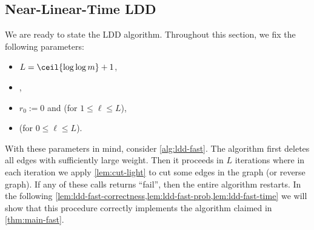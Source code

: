 \subsection{Near-Linear-Time LDD} \label{sec:ldd-fast:sec:algo}
We are ready to state the LDD algorithm. Throughout this section, we fix the following parameters:
\begin{itemize}
    \item $L = \ceil{\log\log m} + 1$,
    \item {},
    \item $r_0 := 0$ and  (for $1 \leq \ell \leq L$),
    \item {} (for $0 \leq \ell \leq L$).
\end{itemize}
With these parameters in mind, consider \cref{alg:ldd-fast}. The algorithm first deletes all edges with sufficiently large weight. Then it proceeds in $L$ iterations where in each iteration we apply \cref{lem:cut-light} to cut some edges in the graph (or reverse graph). If any of these calls returns ``fail'', then the entire algorithm restarts. In the following \cref{lem:ldd-fast-correctness,lem:ldd-fast-prob,lem:ldd-fast-time} we will show that this procedure correctly implements the algorithm claimed in \cref{thm:main-fast}.

